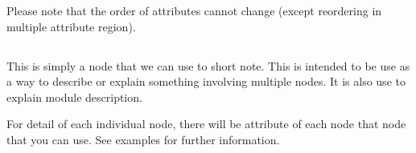 \documentclass[master.tex]{subfiles}
\begin{document}
Please note that the order of attributes cannot change (except reordering in multiple attribute region).



\subsection{\kComment {}}
This is simply a node that we can use to short note. This is intended to be use as a way to describe or explain something involving multiple nodes. It is also use to explain module description.

For detail of each individual node, there will be \kComment attribute of each node that node that you can use. See examples for further information.
\end{document}

